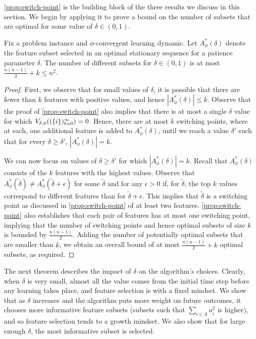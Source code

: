 \cref{prop:switch-point} is the building block of the three results we discuss in this section. We begin by applying it to prove a bound on the number of subsets that are optimal for some value of $\delta \in (0,1)$.





\begin{proposition} \label{prop-delta-bounded}
Fix a problem instance and $\phi$-convergent learning dynamic. Let $A_\phi^*(\delta)$ denote the feature subset selected in an optimal stationary sequence for a patience parameter $\delta$. The number of different subsets for $\delta \in (0,1)$ is at most $\frac{n(n-1)}{2} + k \leq n^2$.
\end{proposition}
\begin{proof}
First, we observe that for small values of \( \delta \), it is possible that there are fewer than \( k \) features with positive values, and hence \( |A_\phi^*(\delta)| \leq k \). Observe that the proof of \cref{prop:switch-point} also implies that there is at most a single $\delta$ value for which \( V_{\delta,\phi}((\{i\})_{t=0}^\infty) = 0 \). Hence, there are at most \( k \) switching points, where at each, one additional feature is added to \( A_\phi^*(\delta) \), until we reach a value \( \delta' \) such that for every \( \delta \geq \delta' \), \( |A_\phi^*(\delta)| = k \). 

We can now focus on values of \( \delta \geq \delta' \) for which \( |A_\phi^*(\delta)| = k \). Recall that \( A_\phi^*(\delta) \) consists of the \( k \) features with the highest values. Observe that \( A_\phi^*(\tilde \delta) \neq A_\phi^*(\tilde \delta+\epsilon) \) for some $\tilde\delta$ and for any \( \epsilon > 0 \) if, for \(\tilde \delta \), the top \( k \) values correspond to different features than for \(\tilde \delta+\epsilon \). This implies that \( \tilde \delta \) is a switching point as discussed in \cref{prop:switch-point} of at least two features. \cref{prop:switch-point} also establishes that each pair of features has at most one switching point, implying that the number of switching points and hence optimal subsets of size $k$ is bounded by $\frac{n(n-1)}{2}$. Adding the number of potentially optimal subsets that are smaller than \( k \), we obtain an overall bound of at most \( \frac{n(n-1)}{2} + k \) optimal subsets, as required.
\end{proof}



The next theorem describes the impact of $\delta$ on the algorithm's choices. Clearly, when $\delta$ is very small, almost all the value comes from the initial time step before any learning takes place, and feature selection is with a fixed mindset.
%
We show that as $\delta$ increases and the algorithm puts more weight on future outcomes, it %
chooses more informative feature subsets (subsets such that  $\sum_{i \in A} a^2_i$ is higher), and so feature selection tends to a growth mindset. We also show that %
for large enough $\delta$, the most informative subset is selected. 




